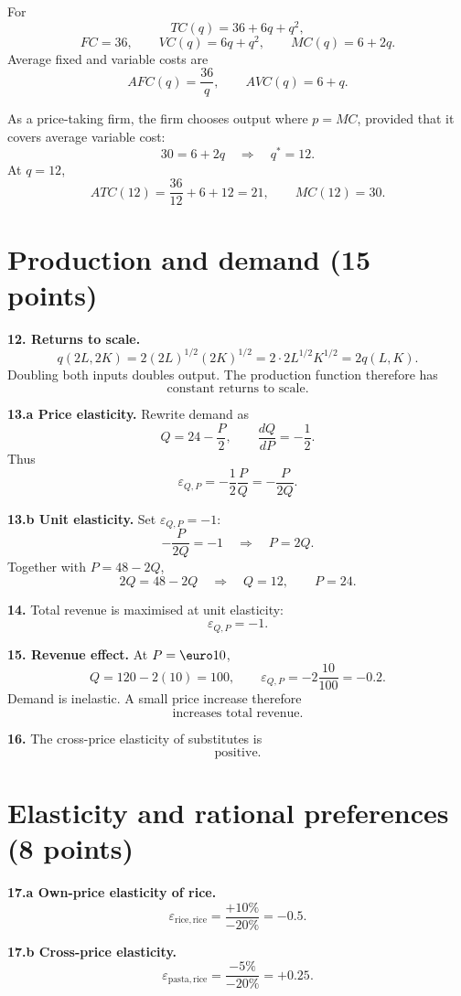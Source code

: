 \documentclass[11pt,a4paper]{article}
\begin{document}
For
\[
TC(q)=36+6q+q^2,
\]
\[
\boxed{FC=36},\qquad
\boxed{VC(q)=6q+q^2},\qquad
\boxed{MC(q)=6+2q}.
\]
Average fixed and variable costs are
\[
\boxed{AFC(q)=\frac{36}{q}},\qquad
\boxed{AVC(q)=6+q}.
\]

As a price-taking firm, the firm chooses output where \(p=MC\), provided that
it covers average variable cost:
\[
30=6+2q
\quad\Longrightarrow\quad
\boxed{q^*=12}.
\]
At \(q=12\),
\[
ATC(12)=\frac{36}{12}+6+12=\boxed{21},
\qquad
MC(12)=\boxed{30}.
\]

\section{Production and demand \hfill (15 points)}

\textbf{12. Returns to scale.}
\[
q(2L,2K)=2(2L)^{1/2}(2K)^{1/2}
=2\cdot2L^{1/2}K^{1/2}=2q(L,K).
\]
Doubling both inputs doubles output. The production function therefore has
\[
\boxed{\text{constant returns to scale}.}
\]

\textbf{13.a Price elasticity.} Rewrite demand as
\[
Q=24-\frac P2,
\qquad
\frac{dQ}{dP}=-\frac12.
\]
Thus
\[
\boxed{\varepsilon_{Q,P}=-\frac12\frac{P}{Q}
=-\frac{P}{2Q}.}
\]

\textbf{13.b Unit elasticity.} Set \(\varepsilon_{Q,P}=-1\):
\[
-\frac{P}{2Q}=-1
\quad\Longrightarrow\quad
P=2Q.
\]
Together with \(P=48-2Q\),
\[
2Q=48-2Q
\quad\Longrightarrow\quad
\boxed{Q=12,\qquad P=24.}
\]

\textbf{14.} Total revenue is maximised at unit elasticity:
\[
\boxed{\varepsilon_{Q,P}=-1.}
\]

\textbf{15. Revenue effect.} At \(P=\text{\euro}10\),
\[
Q=120-2(10)=100,
\qquad
\varepsilon_{Q,P}=-2\frac{10}{100}=\boxed{-0.2}.
\]
Demand is inelastic. A small price increase therefore
\[
\boxed{\text{increases total revenue}.}
\]

\textbf{16.} The cross-price elasticity of substitutes is
\[
\boxed{\text{positive}.}
\]

\section{Elasticity and rational preferences \hfill (8 points)}

\textbf{17.a Own-price elasticity of rice.}
\[
\varepsilon_{\mathrm{rice,rice}}
=\frac{+10\%}{-20\%}
=\boxed{-0.5}.
\]

\textbf{17.b Cross-price elasticity.}
\[
\varepsilon_{\mathrm{pasta,rice}}
=\frac{-5\%}{-20\%}
=\boxed{+0.25}.
\]
\end{document}
